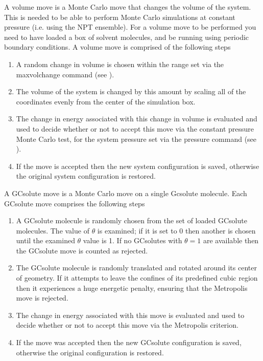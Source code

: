 \documentclass[letterpaper,10pt,english]{sphinxmanual}
\begin{document}
A volume move is a Monte Carlo move that changes the volume of the system. This is needed to be able to perform Monte Carlo simulations at constant pressure (i.e. using the NPT ensemble). For a volume move to be performed you need to have loaded a box of solvent molecules, and be running using periodic boundary conditions. A volume move is comprised of the following steps
\begin{enumerate}
\item {} 
A random change in volume is chosen within the range set via the maxvolchange command (see {\hyperref[\detokenize{protoms:parameters}]{}}).

\item {} 
The volume of the system is changed by this amount by scaling all of the coordinates evenly from the center of the simulation box.

\item {} 
The change in energy associated with this change in volume is evaluated and used to decide whether or not to accept this move via the constant pressure Monte Carlo test, for the system pressure set via the pressure command (see {\hyperref[\detokenize{protoms:parameters}]{}}).

\item {} 
If the move is accepted then the new system configuration is saved, otherwise the original system configuration is restored.

\end{enumerate}

\ignorespaces 
{}

A GCsolute move is a Monte Carlo move on a single Gcsolute molecule. Each GCsolute move comprises the following steps
\begin{enumerate}
\item {} 
A GCsolute molecule is randomly chosen from the set of loaded GCsolute molecules.  The value of \(\theta\) is examined; if it is set to 0 then another is chosen until the examined \(\theta\) value is 1.  If no GCsolutes with \(\theta=1\) are available then the GCsolute move is counted as rejected.

\item {} 
The GCsolute molecule is randomly translated and rotated around its center of geometry. If it attempts to leave the confines of its predefined cubic region then it experiences a huge energetic penalty, ensuring that the Metropolis move is rejected.

\item {} 
The change in energy associated with this move is evaluated and used to decide whether or not to accept this move via the Metropolis criterion.

\item {} 
If the move was accepted then the new GCsolute configuration is saved, otherwise the original configuration is restored.

\end{enumerate}
\end{document}
